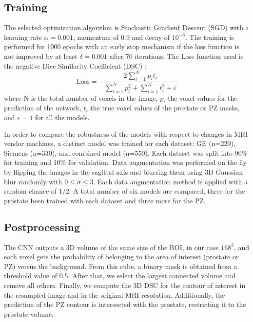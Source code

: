 \subsection{Training}
\label{subsec:training}
The selected optimization algorithm is Stochastic Gradient Descent (SGD) with a learning rate $\alpha = 0.001$, momentum of 0.9 and decay of $10^{-6}$. The training is performed for 1000 epochs with an early stop mechanism if the loss function is not improved by at least $\delta = 0.001$ after 70 iterations. The Loss function used is the negative Dice Similarity Coefficient (DSC) \cite{dice1945measures}:  
\begin{equation}
\text{Loss} = - \frac{2 \sum_{i=1}^{N}p_it_i}{\sum_{i=1}^{N}p_i^2 + \sum_{i=1}^{N}t_i^2 + \varepsilon} 
\label{eq:dsc}
\end{equation}
where N is the total number of voxels in the image, $p_i$ the voxel values for the prediction of the network, $t_i$ the true voxel values of the prostate or PZ masks, and $\varepsilon = 1$ for all the models.

In order to compare the robustness of the models with respect to changes in MRI vendor machines,  a distinct model was trained for each dataset: GE (n=220), Siemens (n=330), and combined model (n=550). Each dataset was split into 90\% for training and 10\% for validation. Data augmentation was performed on the fly by flipping the images in the sagittal axis and blurring them using 3D Gaussian blur randomly with $0 \leq \sigma \leq 3$. Each data augmentation method is applied with a random chance of $1/2$.  
A total number of six models are compared, three for the prostate been trained with each dataset and three more for the PZ. 

\subsection{Postprocessing}
The CNN outputs a 3D volume of the same size of the ROI, in our case $168^3$, and each voxel gets the probability of belonging to the area of interest (prostate or PZ) versus the background. From this cube, a binary mask is obtained from a threshold value of 0.5. After that, we select the largest connected volume and remove all others. Finally, we compute the 3D DSC for the contour of interest in the resampled image and in the original MRI resolution. Additionally, the prediction of the PZ contour is intersected with the prostate, restricting it to the prostate volume.

